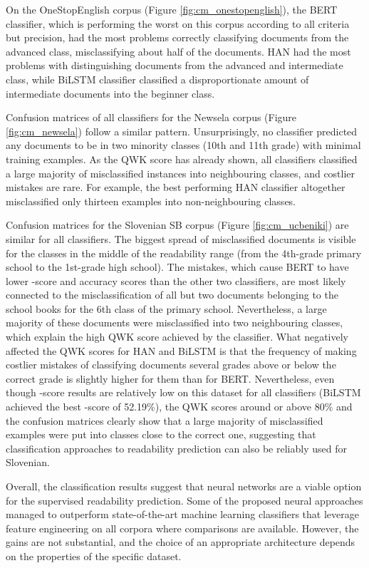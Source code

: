 \documentclass{clv3}
\begin{document}
On the OneStopEnglish corpus (Figure \ref{fig:cm_onestopenglish}), the BERT classifier, which is performing the worst on this corpus according to all criteria but precision, had the most problems correctly classifying documents from the advanced class, misclassifying about half of the documents. HAN had the most problems with distinguishing documents from the advanced and intermediate class, while BiLSTM classifier classified a disproportionate amount of intermediate documents into the beginner class.

Confusion matrices of all classifiers for the Newsela corpus (Figure \ref{fig:cm_newsela}) follow a similar pattern. Unsurprisingly, no classifier predicted any documents to be in two minority classes (10th and 11th grade) with minimal training examples. As the QWK score has already shown, all classifiers classified a large majority of misclassified instances into neighbouring classes, and costlier mistakes are rare. For example, the best performing HAN classifier altogether misclassified only thirteen examples into non-neighbouring classes.

Confusion matrices for the Slovenian SB corpus (Figure \ref{fig:cm_ucbeniki}) are  similar for all classifiers. The biggest spread of misclassified documents is visible for the classes in the middle of the readability range (from the 4th-grade primary school to the 1st-grade high school). The mistakes, which cause BERT to have lower -score and accuracy scores than the other two classifiers, are most likely connected to the misclassification of all but two documents belonging to the school books for the 6th class of the primary school. Nevertheless, a large majority of these documents were misclassified into two neighbouring classes, which explain the high QWK score achieved by the classifier. What negatively affected the QWK scores for HAN and BiLSTM is that the frequency of making costlier mistakes of classifying documents several grades above or below the correct grade is slightly higher for them than for BERT. Nevertheless, even though -score results are relatively low on this dataset for all classifiers (BiLSTM achieved the best -score of 52.19\%), the QWK scores around or above 80\% and the confusion matrices clearly show that a large majority of misclassified examples were put into classes close to the correct one, suggesting that classification approaches to readability prediction can also be reliably used for Slovenian.

Overall, the classification results suggest that neural networks are a viable option for the supervised readability prediction. Some of the proposed neural approaches managed to outperform state-of-the-art machine learning classifiers that leverage feature engineering \citep{xia2016text, vajjala2018onestopenglish, deutsch2020linguistic} on all corpora where comparisons are available. However, the gains are not substantial, and the choice of an appropriate architecture depends on the properties of the specific dataset.    
\end{document}
